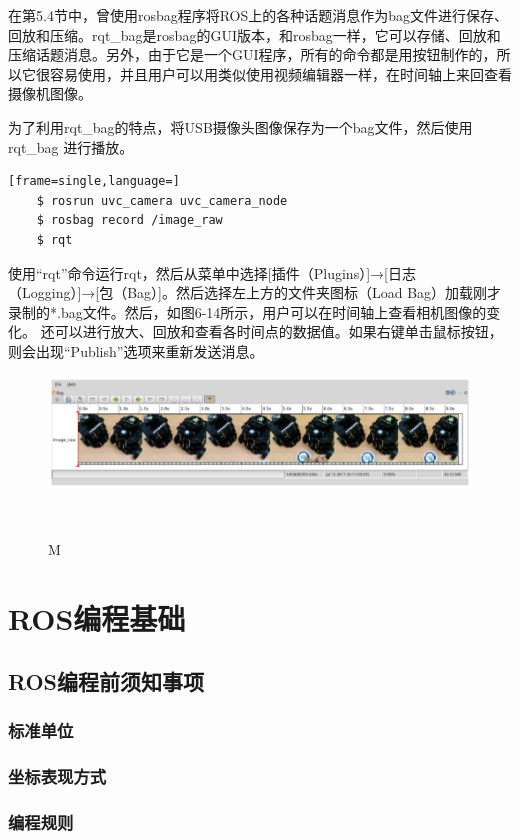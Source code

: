 \documentclass[geye,green,kindle,cn]{elegantnote}
\begin{document}
在第5.4节中，曾使用rosbag程序将ROS上的各种话题消息作为bag文件进行保存、回放和压缩。rqt\_bag是rosbag的GUI版本，和rosbag一样，它可以存储、回放和压缩话题消息。另外，由于它是一个GUI程序，所有的命令都是用按钮制作的，所以它很容易使用，并且用户可以用类似使用视频编辑器一样，在时间轴上来回查看摄像机图像。

为了利用rqt\_bag的特点，将USB摄像头图像保存为一个bag文件，然后使用rqt\_bag 进行播放。
\begin{lstlisting}[frame=single,language=]
    $ rosrun uvc_camera uvc_camera_node 
    $ rosbag record /image_raw 
    $ rqt 
\end{lstlisting}

使用“rqt”命令运行rqt，然后从菜单中选择[插件（Plugins）]→[日志 （Logging）]→[包（Bag）]。然后选择左上方的文件夹图标（Load Bag）加载刚才 录制的*.bag文件。然后，如图6-14所示，用户可以在时间轴上查看相机图像的变化。 还可以进行放大、回放和查看各时间点的数据值。如果右键单击鼠标按钮，则会出现“Publish”选项来重新发送消息。

\begin{figure}[htbp]
    \centering
    \includegraphics[width=1\linewidth]{src/M.png}
    \centering
    \caption{M} \label{picture:M}
\end{figure}
\section{ROS编程基础}
\subsection{ROS编程前须知事项}
\subsubsection{标准单位}

\subsubsection{坐标表现方式}
\subsubsection{编程规则}
\end{document}
